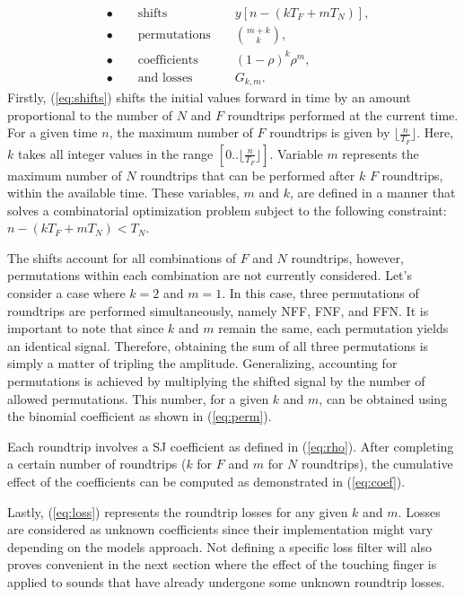 \documentclass{sigchi}
\begin{document}
\begin{align}
	\label{eq:shifts} & \bullet\qquad\textrm{shifts }       &  & y[n - (kT_F + mT_N)],  \\[1em]
	\label{eq:perm}   & \bullet\qquad\textrm{permutations } &  & \binom{m+k}{k},        \\[1em]
	\label{eq:coef}   & \bullet\qquad\textrm{coefficients } &  & (1 - \rho)^{k} \rho^m, \\[1em]
	\label{eq:loss}   & \bullet\qquad\textrm{and losses }   &  & G_{k,m}.
\end{align}
Firstly, (\ref{eq:shifts}) shifts the initial values forward in time by an amount proportional to the number of $N$ and $F$ roundtrips performed at the current time.
For a given time $n$, the maximum number of $F$ roundtrips is given by $\lfloor \frac{n}{T_F} \rfloor$.
Here, $k$ takes all integer values in the range $[0..\lfloor \frac{n}{T_F} \rfloor]$.
Variable $m$ represents the maximum number of $N$ roundtrips that can be performed after $k$ $F$ roundtrips, within the available time.
These variables, $m$ and $k$, are defined in a manner that solves a combinatorial optimization problem subject to the following constraint: $n - (kT_F + mT_N) < T_N$.

The shifts account for all combinations of $F$ and $N$ roundtrips, however, permutations within each combination are not currently considered.
Let's consider a case where $k = 2$ and $m = 1$.
In this case, three permutations of roundtrips are performed simultaneously, namely NFF, FNF, and FFN.
It is important to note that since $k$ and $m$ remain the same, each permutation yields an identical signal.
Therefore, obtaining the sum of all three permutations is simply a matter of tripling the amplitude.
Generalizing, accounting for permutations is achieved by multiplying the shifted signal by the number of allowed permutations.
This number, for a given $k$ and $m$, can be obtained using the binomial coefficient as shown in (\ref{eq:perm}).

Each roundtrip involves a SJ coefficient as defined in (\ref{eq:rho}).
After completing a certain number of roundtrips ($k$ for $F$ and $m$ for $N$ roundtrips), the cumulative effect of the coefficients can be computed as demonstrated in (\ref{eq:coef}).

Lastly, (\ref{eq:loss}) represents the roundtrip losses for any given $k$ and $m$.
Losses are considered as unknown coefficients since their implementation might vary depending on the models approach.
Not defining a specific loss filter will also proves convenient in the next section where the effect of the touching finger is applied to sounds that have already undergone some unknown roundtrip losses.
\end{document}

